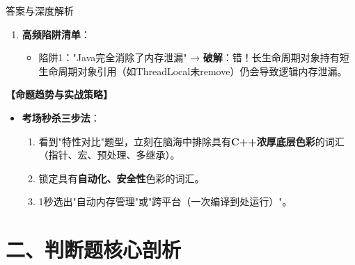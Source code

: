 \documentclass[12pt, a4paper]{ctexart}
\begin{document}
\begin{enumerate}[label=\textbf{\arabic*.}]
\begin{bluebox}{答案与深度解析}
\begin{enumerate}[leftmargin=*, nosep]
			      \item \textbf{高频陷阱清单}：
			            \begin{itemize}
				            \item 陷阱1："Java完全消除了内存泄漏" → \textbf{破解}：错！长生命周期对象持有短生命周期对象引用（如ThreadLocal未remove）仍会导致逻辑内存泄漏。
			            \end{itemize}
		      \end{enumerate}

		      \textbf{【命题趋势与实战策略】}
		      \begin{itemize}[leftmargin=*, nosep]
			      \item \textbf{考场秒杀三步法}：
			            \begin{enumerate}
				            \item 看到"特性对比"题型，立刻在脑海中排除具有\textbf{C++浓厚底层色彩}的词汇（指针、宏、预处理、多继承）。
				            \item 锁定具有\textbf{自动化、安全性}色彩的词汇。
				            \item 1秒选出"自动内存管理"或"跨平台（一次编译到处运行）"。
			            \end{enumerate}
		      \end{itemize}
	      \end{bluebox}

\end{enumerate}

\newpage
\section{二、判断题核心剖析}
\end{document}

